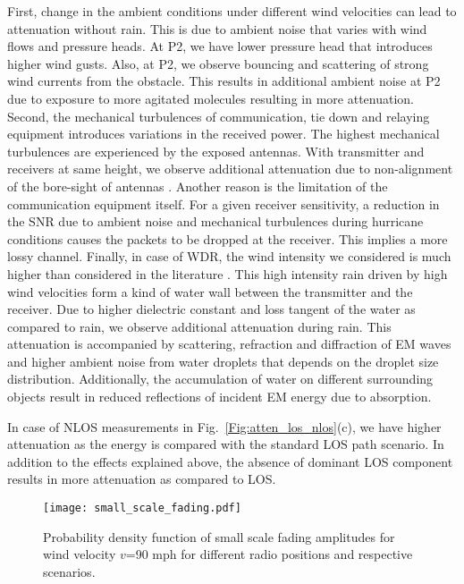 \documentclass[conference]{IEEEtran}
\begin{document}
First, change in the ambient conditions under different wind velocities can lead to attenuation without rain. This is due to ambient noise that varies with wind flows and pressure heads. At P2, we have lower pressure head that introduces higher wind gusts. Also, at P2, we observe bouncing and scattering of strong wind currents from the obstacle. This results in additional ambient noise at P2 due to exposure to more agitated molecules resulting in more attenuation. Second, the mechanical turbulences of communication, tie down and relaying equipment introduces variations in the received power. The highest mechanical turbulences are experienced by the exposed antennas. With transmitter and receivers at same height, we observe additional attenuation due to non-alignment of the bore-sight of antennas \cite{TD}. Another reason is the limitation of the communication equipment itself. For a given receiver sensitivity, a reduction in the SNR due to ambient noise and mechanical turbulences during hurricane conditions causes the packets to be dropped at the receiver. This implies a more lossy channel. Finally, in case of WDR, the wind intensity we considered is much higher than considered in the literature \cite{uwb4,Weather_new3}. This high intensity rain driven by high wind velocities form a kind of water wall between the transmitter and the receiver. Due to higher dielectric constant and loss tangent of the water as compared to rain, we observe additional attenuation during rain. This attenuation is accompanied by scattering, refraction and diffraction of EM waves and higher ambient noise from water droplets that depends on the droplet size distribution. Additionally, the accumulation of water on different surrounding objects result in reduced reflections of incident EM energy due to absorption.

In case of NLOS measurements in Fig.~\ref{Fig:atten_los_nlos}(c), we have higher attenuation as the energy is compared with the standard LOS path scenario. In addition to the effects explained above, the absence of dominant LOS component results in more attenuation as compared to LOS.  
\begin{figure}[!h]
	\centering
	\texttt{[image: small\_scale\_fading.pdf]}
	\caption{Probability density function of small scale fading amplitudes for wind velocity $v$=90 mph for different radio positions and respective scenarios.}\label{Fig:small_scale_fading}
     \vspace{-0.1cm}
\end{figure}
\end{document}
